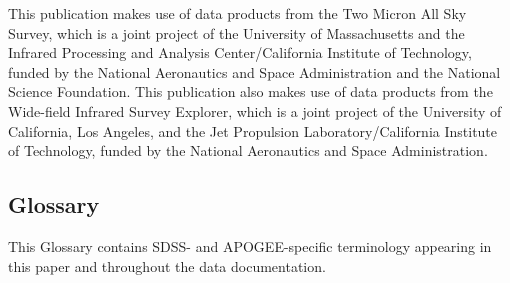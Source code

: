 \documentclass[12pt,twocolumn]{emulateapj}
\begin{document}
\begin{acknowledgments}
This publication makes use of data products from the Two Micron All Sky Survey, which is a joint project of the University of Massachusetts and the Infrared Processing and Analysis Center/California Institute of Technology, funded by the National Aeronautics and Space Administration and the National Science Foundation.  This publication also makes use of data products from the Wide-field Infrared Survey Explorer, which is a joint project of the University of California, Los Angeles, and the Jet Propulsion Laboratory/California Institute of Technology, funded by the National Aeronautics and Space Administration.

\end{acknowledgments}




\begin{appendix}

\section{Glossary}
\label{sec:glossary}

This Glossary contains SDSS- and APOGEE-specific terminology appearing in this paper and throughout the data documentation.


\end{appendix}
\end{document}
